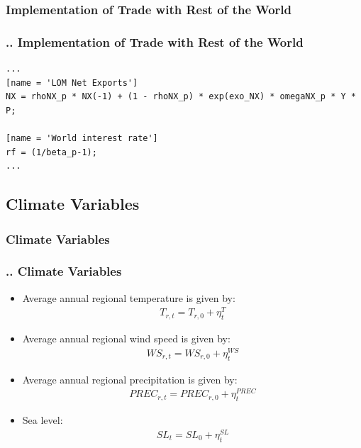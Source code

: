 \documentclass[11pt,aspectratio=169]{beamer}
\begin{document}
\subsubsection{Implementation of Trade with Rest of the World}
\begin{frame}[fragile]
\frametitle{{\thesection.\thesubsection.\thesubsubsection} Implementation of Trade with Rest of the World}

\begin{lstlisting}[frame = single]
...
[name = 'LOM Net Exports']
NX = rhoNX_p * NX(-1) + (1 - rhoNX_p) * exp(exo_NX) * omegaNX_p * Y * P;

[name = 'World interest rate']
rf = (1/beta_p-1);
...
\end{lstlisting}
\end{frame}

\subsection{Climate Variables}

\subsubsection{Climate Variables}
\begin{frame}
\frametitle{{\thesection.\thesubsection.\thesubsubsection} Climate Variables}
\scriptsize
\begin{itemize}
\item Average annual regional temperature is given by:
\begin{align*}
T_{r,t} = T_{r,0} + \eta^{T}_{t}
\end{align*}
\item Average annual regional wind speed is given by:
\begin{align*}
WS_{r,t} = WS_{r,0} + \eta^{WS}_{t}
\end{align*}
\item Average annual regional precipitation is given by:
\begin{align*}
PREC_{r,t} = PREC_{r,0} + \eta^{PREC}_{t}
\end{align*}

\item Sea level:
\begin{align*}
SL_{t} = SL_{0} + \eta^{SL}_{t}
\end{align*}
\end{itemize}
\end{frame}
\end{document}
